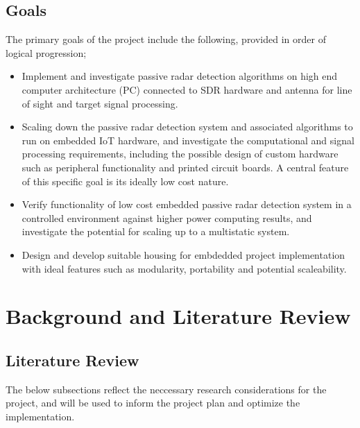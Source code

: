 \documentclass[12pt,a4paper]{article}
\begin{document}
\subsection{Goals}
The primary goals of the project include the following, provided in order of logical progression;
\begin{itemize}
    \item Implement and investigate passive radar detection algorithms on high end computer architecture (PC) connected to SDR hardware and antenna for line of sight and target signal processing.
    \item Scaling down the passive radar detection system and associated algorithms to run on embedded IoT hardware, and investigate the computational and signal processing requirements, including the possible design of custom hardware such as peripheral functionality and printed circuit boards. A central feature of this specific goal is its ideally low cost nature.
    \item Verify functionality of low cost embedded passive radar detection system in a controlled environment against higher power computing results, and investigate the potential for scaling up to a multistatic system.
    \item Design and develop suitable housing for embdedded project implementation with ideal features such as modularity, portability and potential scaleability. 
\end{itemize}


\section{Background and Literature Review}

\subsection{Literature Review}
The below subsections reflect the neccessary research considerations for the project, and will be used to inform the project plan and optimize the implementation.
\end{document}
